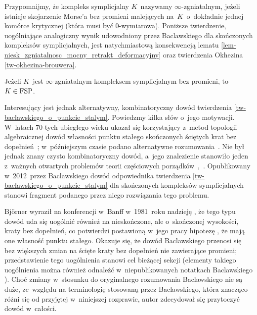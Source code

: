 Przypomnijmy, że kompleks symplicjalny $K$~nazywamy $\infty$-zgniatalnym, jeżeli istnieje skojarzenie Morse'a bez promieni malejących na~$K$~o~dokładnie jednej komórce krytycznej (która musi być $0$-wymiarowa). Poniższe twierdzenie, uogólniające analogiczny wynik udowodniony przez Baclawskiego \cite[Theorem 32]{Baclawski12} dla skończonych kompleksów symplicjalnych, jest natychmiastową konsekwencją lematu \ref{lem-niesk_zgniatalnosc_mocny_retrakt_deformacyjny} oraz twierdzenia Okhezina \ref{tw-okhezina-brouwera}.
\begin{tw}\label{tw-baclawskiego_o_punkcie_stalym}
Jeżeli $K$~jest $\infty$-zgniatalnym kompleksem symplicjalnym bez promieni, to $K\in\mathrm{FSP}$.
\end{tw}

Interesujący jest jednak alternatywny, kombinatoryczny dowód twierdzenia \ref{tw-baclawskiego_o_punkcie_stalym}. Powiedzmy kilka słów o~jego motywacji. W~latach 70-tych ubiegłego wieku ukazał się korzystający z~metod topologii algebraicznej dowód własności punktu stałego skończonych ściętych krat bez dopełnień~\cite{Baclawski79}; w~późniejszym czasie podano alternatywne rozumowania~\cite{Constantin85,Schroder99}. Nie był jednak znany czysto kombinatoryczny dowód, a~jego znalezienie stanowiło jeden z~ważnych otwartych problemów teorii częściowych porządków~\cite{Baclawski81},~\cite[s.~838]{Rival82}. Opublikowany w~2012~przez Baclawskiego \cite{Baclawski12} dowód odpowiednika twierdzenia \ref{tw-baclawskiego_o_punkcie_stalym} dla skończonych kompleksów symplicjalnych stanowi fragment podanego przez niego rozwiązania tego problemu.

Bj{\"o}rner wyraził na konferencji w~Banff w~1981~roku nadzieję \cite[s.~838]{Rival82}, że tego typu dowód uda się uogólnić również na nieskończone, ale o~skończonej wysokości, kraty bez dopełnień, co potwierdzi postawioną w~jego pracy hipotezę \cite[s.~98]{Bjorner81}, że mają one własność punktu stałego. Okazuje się, że dowód Baclawskiego przenosi się bez większych zmian na ścięte kraty bez dopełnień nie zawierające promieni; przedstawienie tego uogólnienia stanowi cel bieżącej sekcji (elementy takiego uogólnienia można również odnaleźć w~niepublikowanych notatkach Baclawskiego \cite{Baclawski}). Choć zmiany w~stosunku do oryginalnego rozumowania Baclawskiego \cite{Baclawski12} nie są duże, ze~względu na terminologię stosowaną przez Baclawskiego, która znacząco różni się od przyjętej w~niniejszej rozprawie, autor zdecydował się przytoczyć dowód w~całości. 

